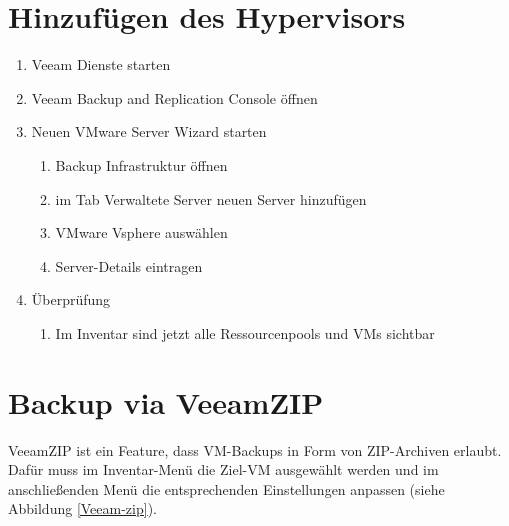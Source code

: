 \hypertarget{hinzufuxfcgen-des-hypervisors}{%
\section{Hinzufügen des
Hypervisors}\label{hinzufuxfcgen-des-hypervisors}}

\begin{enumerate}
\def\labelenumi{\arabic{enumi}.}
\tightlist
\item
  Veeam Dienste starten
\item
  Veeam Backup and Replication Console öffnen
\item
  Neuen VMware Server Wizard starten

  \begin{enumerate}
  \def\labelenumii{\arabic{enumii}.}
  \tightlist
  \item
    Backup Infrastruktur öffnen
  \item
    im Tab Verwaltete Server neuen Server hinzufügen
  \item
    VMware Vsphere auswählen
  \item
    Server-Details eintragen
  \end{enumerate}
\item
  Überprüfung

  \begin{enumerate}
  \def\labelenumii{\arabic{enumii}.}
  \tightlist
  \item
    Im Inventar sind jetzt alle Ressourcenpools und VMs sichtbar
  \end{enumerate}
\end{enumerate}

\hypertarget{backup-via-veeamzip}{%
\section{Backup via VeeamZIP}\label{backup-via-veeamzip}}

VeeamZIP ist ein Feature, dass VM-Backups in Form von ZIP-Archiven
erlaubt. Dafür muss im Inventar-Menü die Ziel-VM ausgewählt werden und
im anschließenden Menü die entsprechenden Einstellungen anpassen (siehe
Abbildung \ref{Veeam-zip}).

